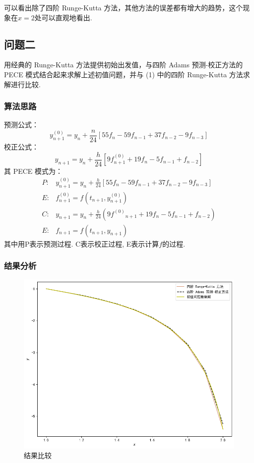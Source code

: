 \documentclass[UTF8,ctexart,a4paper,11pt,openany]{article}
\theoremstyle{definition}
\begin{document}
    可以看出除了四阶 Runge-Kutta 方法，其他方法的误差都有增大的趋势，这个现象在$x=2$处可以直观地看出. 

    \subsection{问题二} 

        用经典的 Runge-Kutta 方法提供初始出发值，与四阶 Adams 预测-校正方法的 PECE 模式结合起来求解上述初值问题，并与 (1) 中的四阶 Runge-Kutta 方法求解进行比较.

        \subsubsection{算法思路}

        预测公式：$$y_{n+1}^{(0)}=y_{n}+\frac{n}{24}\left[55 f_{n}-59 f_{n-1}+37 f_{n-2}-9 f_{n-3}\right]$$校正公式：$$y_{n+1}=y_{n}+\frac{h}{24}\left[9 f_{n+1}^{(0)}+19 f_{n}-5 f_{n-1}+f_{n-2}\right]$$其 PECE 模式为：$$\begin{array}{ll}P: & y_{n+1}^{(0)}=y_{n}+\frac{h}{24}\left[55 f_{n}-59 f_{n-1}+37 f_{n-2}-9 f_{n-3}\right] \\ E: & f_{n+1}^{(0)}=f\left(t_{n+1}, y_{n+1}^{(0)}\right) \\ C: & y_{n+1}=y_{n}+\frac{h}{24}\left(9 f^{(0)}{ }_{n+1}+19 f_{n}-5 f_{n-1}+f_{n-2}\right) \\ E: & f_{n+1}=f\left(t_{n+1}, y_{n+1}\right)\end{array}$$其中用P表示预测过程. C表示校正过程, E表示计算$f$的过程. 

        \subsubsection{结果分析}
        \begin{figure}[H]
            \centering
            \includegraphics[width=0.45\linewidth]{pics/P9.6.png}
            \caption{结果比较}
            \end{figure}
        
\end{document}
